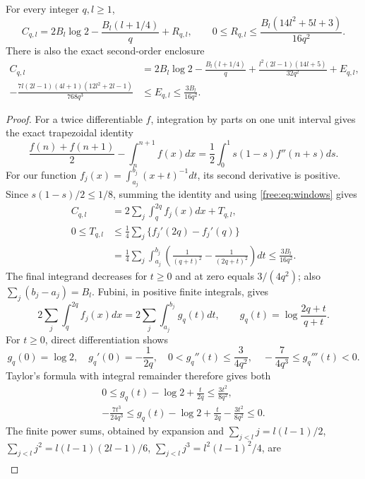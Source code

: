 \begin{theorem}\label{free:thm:expansion}
For every integer $q,l\ge1$,
\begin{equation}\label{free:eq:first}
 C_{q,l}=2B_l\log2-\frac{B_l(l+1/4)}q+R_{q,l},\qquad
 0\le R_{q,l}\le\frac{B_l(14l^2+5l+3)}{16q^2}.
\end{equation}
There is also the exact second-order enclosure
\begin{align}
 C_{q,l}
 &=2B_l\log2-\frac{B_l(l+1/4)}q
  +\frac{l^2(2l-1)(14l+5)}{32q^2}+E_{q,l},\label{free:eq:second}\\
 -\frac{7l(2l-1)(4l+1)(12l^2+2l-1)}{768q^3}
 &\le E_{q,l}\le\frac{3B_l}{16q^2}.\label{free:eq:error}
\end{align}
\end{theorem}
\begin{proof}
For a twice differentiable $f$, integration by parts on one unit interval
gives the exact trapezoidal identity
\[
 \frac{f(n)+f(n+1)}2-\int_n^{n+1}f(x)dx
 =\frac12\int_0^1s(1-s)f''(n+s)ds.
\]
For our function
$f_j(x)=\int_{a_j}^{b_j}(x+t)^{-1}dt$, its second derivative is positive.
Since $s(1-s)/2\le1/8$, summing the identity and using
\eqref{free:eq:windows} gives
\begin{align*}
 C_{q,l}&=2\sum_j\int_q^{2q}f_j(x)dx+T_{q,l},\\
 0\le T_{q,l}
 &\le\frac14\sum_j\{f_j'(2q)-f_j'(q)\}\\
 &=\frac14\sum_j\int_{a_j}^{b_j}
                  \left(\frac1{(q+t)^2}-\frac1{(2q+t)^2}\right)dt
 \le\frac{3B_l}{16q^2}.
\end{align*}
The final integrand decreases for $t\ge0$ and at zero equals $3/(4q^2)$;
also $\sum_j(b_j-a_j)=B_l$. Fubini, in positive finite integrals, gives
\[
 2\sum_j\int_q^{2q}f_j(x)dx
 =2\sum_j\int_{a_j}^{b_j}g_q(t)dt,
 \qquad g_q(t)=\log\frac{2q+t}{q+t}.
\]
For $t\ge0$, direct differentiation shows
\[
 g_q(0)=\log2,\quad g_q'(0)=-\frac1{2q},\quad
 0<g_q''(t)\le\frac3{4q^2},\quad
 -\frac7{4q^3}\le g_q'''(t)<0.
\]
Taylor's formula with integral remainder therefore gives both
\begin{gather*}
 0\le g_q(t)-\log2+\frac{t}{2q}\le\frac{3t^2}{8q^2},\\
 -\frac{7t^3}{24q^3}
 \le g_q(t)-\log2+\frac{t}{2q}-\frac{3t^2}{8q^2}\le0.
\end{gather*}
The finite power sums, obtained by expansion and
$\sum_{j<l}j=l(l-1)/2$, $\sum_{j<l}j^2=l(l-1)(2l-1)/6$,
$\sum_{j<l}j^3=l^2(l-1)^2/4$, are
\begin{align*}

\end{align*}
\end{proof}
